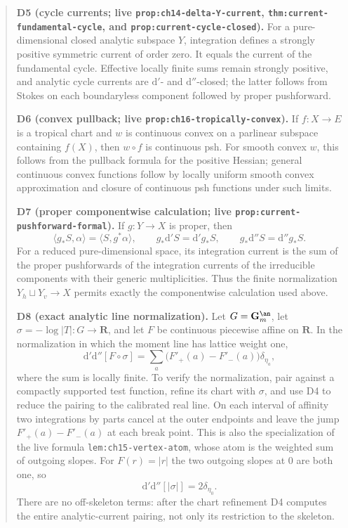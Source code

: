 \begin{quote}
\textbf{D5 (cycle currents; live
\texttt{prop:ch14-delta-Y-current},
\texttt{thm:current-fundamental-cycle}, and
\texttt{prop:current-cycle-closed}).}
For a pure-dimensional closed analytic subspace $Y$, integration defines a
strongly positive symmetric current of order zero.  It equals the current
of the fundamental cycle.  Effective locally finite sums remain strongly
positive, and analytic cycle currents are $\mathrm d'$- and
$\mathrm d''$-closed; the latter follows from Stokes on each boundaryless
component followed by proper pushforward.

\textbf{D6 (convex pullback; live
\texttt{prop:ch16-tropically-convex}).}
If $f:X\to E$ is a tropical chart and $w$ is continuous convex on a
parlinear subspace containing $f(X)$, then $w\circ f$ is continuous psh.
For smooth convex $w$, this follows from the pullback formula for the
positive Hessian; general continuous convex functions follow by locally
uniform smooth convex approximation and closure of continuous psh functions
under such limits.

\textbf{D7 (proper componentwise calculation; live
\texttt{prop:current-pushforward-formal}).}
If $g:Y\to X$ is proper, then
\[
 \langle g_*S,\alpha\rangle=\langle S,g^*\alpha\rangle,
 \qquad
 g_*\mathrm d'S=\mathrm d'g_*S,
 \qquad
 g_*\mathrm d''S=\mathrm d''g_*S.
\]
For a reduced pure-dimensional space, its integration current is the sum of
the proper pushforwards of the integration currents of the irreducible
components with their generic multiplicities.  Thus the finite
normalization $Y_h\sqcup Y_v\to X$ permits exactly the componentwise
calculation used above.

\textbf{D8 (exact analytic line normalization).}
Let $G=\mathbf G_m^{\an}$, let
$\sigma=-\log|T|:G\to\mathbf R$, and let $F$ be continuous piecewise affine
on $\mathbf R$.  In the normalization in which the moment line has lattice
weight one,
\[
 \mathrm d'\mathrm d''[F\circ\sigma]
 =\sum_a\bigl(F'_+(a)-F'_-(a)\bigr)\delta_{\eta_a},
\]
where the sum is locally finite.  To verify the normalization, pair against
a compactly supported test function, refine its chart with $\sigma$, and
use D4 to reduce the pairing to the calibrated real line.  On each interval
of affinity two integrations by parts cancel at the outer endpoints and
leave the jump $F'_+(a)-F'_-(a)$ at each break point.  This is also the
specialization of the live formula
\texttt{lem:ch15-vertex-atom}, whose atom is the weighted sum of outgoing
slopes.  For $F(r)=|r|$ the two outgoing slopes at $0$ are both one, so
\[
 \mathrm d'\mathrm d''[|\sigma|]=2\delta_{\eta_0}.
\]
There are no off-skeleton terms: after the chart refinement D4 computes the
entire analytic-current pairing, not only its restriction to the skeleton.


\end{quote}

